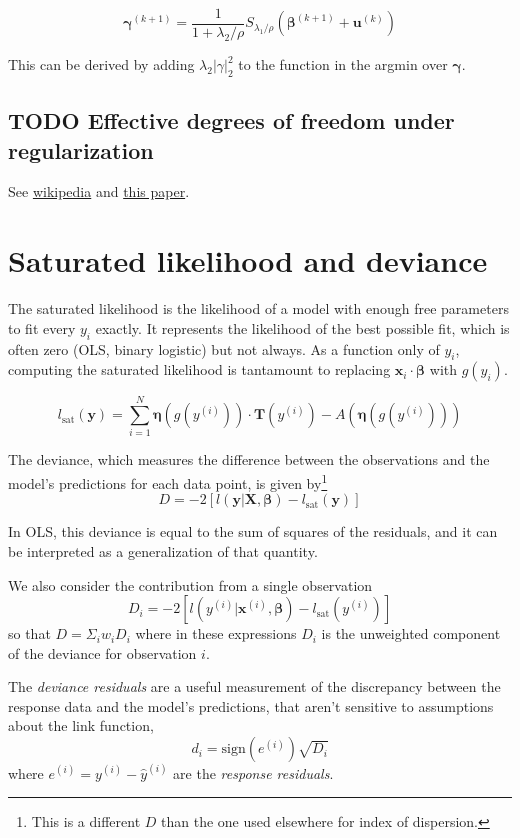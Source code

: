 \documentclass{article}
\newcommand{\bbeta}{\boldsymbol{\beta}}
\begin{document}
\[ \boldsymbol{\gamma}^{(k+1)} = \frac{1}{1 + \lambda_2/\rho} S_{\lambda_1/\rho}(\bbeta^{(k+1)} + \mathbf{u}^{(k)}) \]

This can be derived by adding \(\lambda_2|\gamma|_2^2\) to the function in
the argmin over \(\boldsymbol{\gamma}\).

\subsection{TODO Effective degrees of freedom under regularization}

See
\href{https://en.wikipedia.org/wiki/Degrees_of_freedom_(statistics)#In_non-standard_regression}{wikipedia}
and \href{https://arxiv.org/abs/1311.2791}{this paper}.


\section{Saturated likelihood and deviance}

The saturated likelihood is the likelihood of a model with enough free
parameters to fit every \(y_i\) exactly. It represents the likelihood of the
best possible fit, which is often zero (OLS, binary logistic) but not always.
As a function only of \(y_i\), computing the saturated likelihood is
tantamount to replacing \(\mathbf{x}_i\cdot\bbeta\) with
\(g(y_i)\).

\[l_{\textrm{sat}}(\mathbf{y}) = \sum_{i=1}^N
\boldsymbol{\eta}(g(y^{(i)})) \cdot
\mathbf{T}(y^{(i)}) - A\left(\boldsymbol{\eta}(g(y^{(i)})) \right)\]

The deviance, which measures the difference between the observations and the
model's predictions for each data point, is given by\footnote{
    This is a different \(D\) than the one used elsewhere for index of dispersion.
}
\[D = -2\left[ l(\mathbf{y}|\mathbf{X}, \bbeta) - l_{\textrm{sat}}(\mathbf{y}) \right]\]

In OLS, this deviance is equal to the sum of squares of the residuals, and it
can be interpreted as a generalization of that quantity.

We also consider the contribution from a single observation
\[D_i = -2\left[ l(y^{(i)}|\mathbf{x}^{(i)}, \bbeta) - l_{\textrm{sat}}(y^{(i)}) \right]\]
so that \(D = \Sigma_i w_i D_i\) where in these expressions $D_i$ is the
unweighted component of the deviance for observation \(i\).

The \emph{deviance residuals} are a useful measurement of the discrepancy
between the response data and the model's predictions, that aren't sensitive to
assumptions about the link function,
\[ d_i = \mathrm{sign}(e^{(i)}) \sqrt{D_i} \]
where \(e^{(i)} = y^{(i)} - \hat{y}^{(i)}\) are the \emph{response residuals}.
\end{document}
